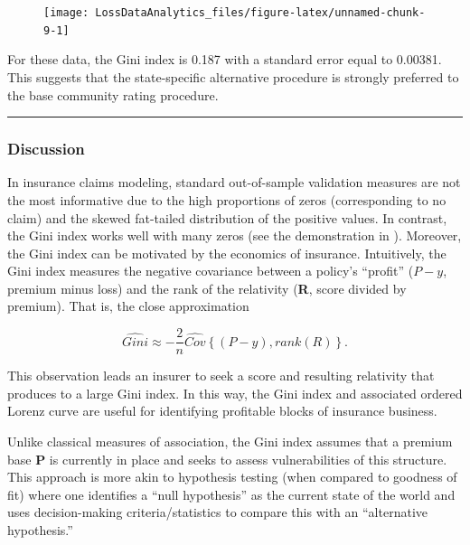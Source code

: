 \documentclass[]{book}
\theoremstyle{definition}
\theoremstyle{definition}
\theoremstyle{definition}
\theoremstyle{remark}
\begin{document}
\begin{figure}

{\centering \texttt{[image: LossDataAnalytics\_files/figure-latex/unnamed-chunk-9-1]} 

}

\end{figure}

For these data, the Gini index is 0.187 with a standard error equal to
0.00381. This suggests that the state-specific alternative procedure is
strongly preferred to the base community rating procedure.

\begin{center}\rule{0.5\linewidth}{\linethickness}\end{center}

\subsubsection*{Discussion}\label{discussion}

In insurance claims modeling, standard out-of-sample validation measures
are not the most informative due to the high proportions of zeros
(corresponding to no claim) and the skewed fat-tailed distribution of
the positive values. In contrast, the Gini index works well with many
zeros (see the demonstration in \citep{frees2014insurance}). Moreover,
the Gini index can be motivated by the economics of insurance.
Intuitively, the Gini index measures the negative covariance between a
policy's ``profit'' (\(P-y\), premium minus loss) and the rank of the
relativity (\textbf{R}, score divided by premium). That is, the close
approximation

\[\widehat{Gini} \approx - \frac{2}{n} \widehat{Cov} \left\{ (P-y), rank(R) \right\} .\]

This observation leads an insurer to seek a score and resulting
relativity that produces to a large Gini index. In this way, the Gini
index and associated ordered Lorenz curve are useful for identifying
profitable blocks of insurance business.

Unlike classical measures of association, the Gini index assumes that a
premium base \textbf{P} is currently in place and seeks to assess
vulnerabilities of this structure. This approach is more akin to
hypothesis testing (when compared to goodness of fit) where one
identifies a ``null hypothesis'' as the current state of the world and
uses decision-making criteria/statistics to compare this with an
``alternative hypothesis.''
\end{document}

